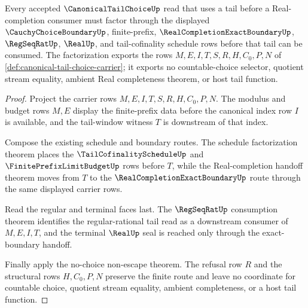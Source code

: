\begin{theorem}
\label{thm:canonical-tail-choice-cofinal-choice-boundary}
Every accepted $\CanonicalTailChoiceUp$ read that uses a tail before a Real-completion consumer must factor through the displayed $\CauchyChoiceBoundaryUp$, finite-prefix, $\RealCompletionExactBoundaryUp$, $\RegSeqRatUp$, $\RealUp$, and tail-cofinality schedule rows before that tail can be consumed. The factorization exports the rows $M,E,I,T,S,R,H,C_0,P,N$ of \autoref{def:canonical-tail-choice-carrier}; it exports no countable-choice selector, quotient stream equality, ambient Real completeness theorem, or host tail function.
\end{theorem}
\begin{proof}
Project the carrier rows $M,E,I,T,S,R,H,C_0,P,N$. The modulus and budget rows $M,E$ display the finite-prefix data before the canonical index row $I$ is available, and the tail-window witness $T$ is downstream of that index.

Compose the existing schedule and boundary routes. The schedule factorization theorem places the $\TailCofinalityScheduleUp$ and $\FinitePrefixLimitBudgetUp$ rows before $T$, while the Real-completion handoff theorem moves from $T$ to the $\RealCompletionExactBoundaryUp$ route through the same displayed carrier rows.

Read the regular and terminal faces last. The $\RegSeqRatUp$ consumption theorem identifies the regular-rational tail read as a downstream consumer of $M,E,I,T$, and the terminal $\RealUp$ seal is reached only through the exact-boundary handoff.

Finally apply the no-choice non-escape theorem. The refusal row $R$ and the structural rows $H,C_0,P,N$ preserve the finite route and leave no coordinate for countable choice, quotient stream equality, ambient completeness, or a host tail function.
\end{proof}

